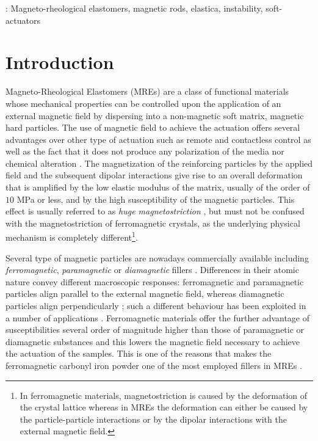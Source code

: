 \documentclass[oneside]{article}
\begin{document}
\vspace{1cm}
: Magneto-rheological elastomers, magnetic rods, elastica, instability, soft-actuators






	\section{Introduction}
Magneto-Rheological Elastomers (MREs) are a class of functional materials whose mechanical properties can be controlled upon the application of an external magnetic field by dispersing into a non-magnetic soft matrix, magnetic hard particles. 
The use of magnetic field to achieve the actuation offers several advantages over other type of actuation such as remote and contactless control as well as the fact that it does not produce any polarization of the media nor chemical alteration \cite{Rikken2014}. 
The magnetization of the reinforcing particles by the applied field and the subsequent dipolar interactions give rise to an overall deformation that is amplified by the low elastic modulus of the matrix, usually of the order of $10$ MPa or less, and by the high susceptibility of the magnetic particles. This effect is usually referred to as \emph{huge magnetostriction} \cite{Kovetz2008}, but must not be confused with the magnetostriction of ferromagnetic crystals, as the underlying physical mechanism is completely different\footnote{In ferromagnetic materials, magnetostriction is caused by the deformation of the crystal lattice whereas in MREs the deformation can either be caused by the particle-particle interactions or by the dipolar interactions with the external magnetic field.}.

Several type of magnetic particles are nowadays commercially available including \emph{ferromagnetic}, \emph{paramagnetic} or \emph{diamagnetic} fillers \cite{Rikken2014}. Differences in their atomic nature convey different macroscopic responses: ferromagnetic and paramagnetic particles align parallel to the external magnetic field, whereas diamagnetic particles align perpendicularly \cite{Shine1987,Ciambella2017}; such a different behaviour has been exploited in a number of applications \cite{Zrinyi1996,Kimura2004,Kimura2012}. Ferromagnetic materials offer the further advantage of susceptibilities several order of magnitude higher than those of paramagnetic or diamagnetic substances and this lowers the magnetic field necessary to achieve the actuation of the samples. This is one of the reasons that makes the ferromagnetic carbonyl iron powder one of the most employed fillers in MREs \cite{Zrinyi1996,VonLockette2011,Li2011,Danas2012,Seffen2016}.
\end{document}
